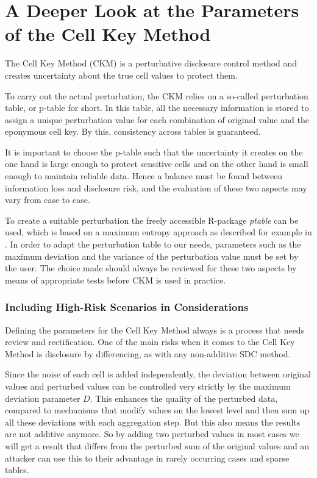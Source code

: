 \section{A Deeper Look at the Parameters of the Cell Key Method}

The Cell Key Method (CKM) is a perturbative disclosure control method and creates uncertainty about the true cell values to protect them.

To carry out the actual perturbation, the CKM relies on a so-called perturbation table, or p-table for short. In this table, all the necessary information is stored to assign a unique perturbation value for each combination of original value and the eponymous cell key. By this, consistency across tables is guaranteed.

It is important to choose the p-table such that the uncertainty it creates on the one hand is large enough to protect sensitive cells and on the other hand is small enough to maintain reliable data. Hence a balance must be found between information loss and disclosure risk, and the evaluation of these two aspects may vary from case to case.

To create a suitable perturbation the freely accessible R-package \textit{ptable} can be used, which is based on a maximum entropy approach as described for example in \cite{discrisk_giessing_psd2016}. In order to adapt the perturbation table to our needs, parameters such as the maximum deviation and the variance of the perturbation value must be set by the user. The choice made should always be reviewed for these two aspects by means of appropriate tests before CKM is used in practice.

\subsubsection{Including High-Risk Scenarios in Considerations}

Defining the parameters for the Cell Key Method always is a process that needs review and rectification. One of the main risks when it comes to the Cell Key Method is disclosure by differencing, as with any non-additive SDC method.

Since the noise of each cell is added independently, the deviation between original values and perturbed values can be controlled very strictly by the maximum deviation parameter $D$. This enhances the quality of the perturbed data, compared to mechanisms that modify values on the lowest level and then sum up all these deviations with each aggregation step. But this also means the results are not additive anymore. So by adding two perturbed values in most cases we will get a result that differs from the perturbed sum of the original values and an attacker can use this to their advantage in rarely occurring cases and sparse tables.

